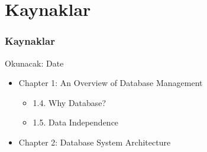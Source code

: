 \documentclass[dvipsnames]{beamer}
\theoremstyle{plain}
\begin{document}
\section*{Kaynaklar}

\begin{frame}
  \frametitle{Kaynaklar}

  \begin{block}{Okunacak: Date}
    \begin{itemize}
      \item Chapter 1: An Overview of Database Management
      \begin{itemize}
        \item 1.4. \alert{Why Database?}
        \item 1.5. \alert{Data Independence}
      \end{itemize}

      \item Chapter 2: \alert{Database System Architecture}
    \end{itemize}
  \end{block}
\end{frame}
\end{document}
